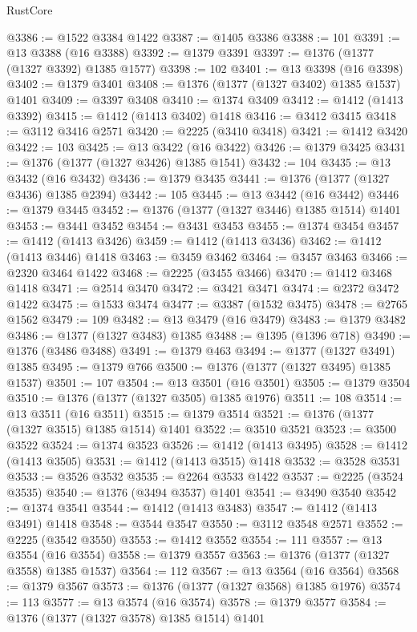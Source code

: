 \begin{lexlean}{RustCore}
\begin{coremodule}
@3386 := @1522 @3384 @1422
@3387 := @1405 @3386
@3388 := 101
@3391 := @13 @3388 (@16 @3388)
@3392 := @1379 @3391
@3397 := @1376 (@1377 (@1327 @3392) @1385 @1577)
@3398 := 102
@3401 := @13 @3398 (@16 @3398)
@3402 := @1379 @3401
@3408 := @1376 (@1377 (@1327 @3402) @1385 @1537) @1401
@3409 := @3397 @3408
@3410 := @1374 @3409
@3412 := @1412 (@1413 @3392)
@3415 := @1412 (@1413 @3402) @1418
@3416 := @3412 @3415
@3418 := @3112 @3416 @2571
@3420 := @2225 (@3410 @3418)
@3421 := @1412 @3420
@3422 := 103
@3425 := @13 @3422 (@16 @3422)
@3426 := @1379 @3425
@3431 := @1376 (@1377 (@1327 @3426) @1385 @1541)
@3432 := 104
@3435 := @13 @3432 (@16 @3432)
@3436 := @1379 @3435
@3441 := @1376 (@1377 (@1327 @3436) @1385 @2394)
@3442 := 105
@3445 := @13 @3442 (@16 @3442)
@3446 := @1379 @3445
@3452 := @1376 (@1377 (@1327 @3446) @1385 @1514) @1401
@3453 := @3441 @3452
@3454 := @3431 @3453
@3455 := @1374 @3454
@3457 := @1412 (@1413 @3426)
@3459 := @1412 (@1413 @3436)
@3462 := @1412 (@1413 @3446) @1418
@3463 := @3459 @3462
@3464 := @3457 @3463
@3466 := @2320 @3464 @1422
@3468 := @2225 (@3455 @3466)
@3470 := @1412 @3468 @1418
@3471 := @2514 @3470
@3472 := @3421 @3471
@3474 := @2372 @3472 @1422
@3475 := @1533 @3474
@3477 := @3387 (@1532 @3475)
@3478 := @2765 @1562
@3479 := 109
@3482 := @13 @3479 (@16 @3479)
@3483 := @1379 @3482
@3486 := @1377 (@1327 @3483) @1385
@3488 := @1395 (@1396 @718)
@3490 := @1376 (@3486 @3488)
@3491 := @1379 @463
@3494 := @1377 (@1327 @3491) @1385
@3495 := @1379 @766
@3500 := @1376 (@1377 (@1327 @3495) @1385 @1537)
@3501 := 107
@3504 := @13 @3501 (@16 @3501)
@3505 := @1379 @3504
@3510 := @1376 (@1377 (@1327 @3505) @1385 @1976)
@3511 := 108
@3514 := @13 @3511 (@16 @3511)
@3515 := @1379 @3514
@3521 := @1376 (@1377 (@1327 @3515) @1385 @1514) @1401
@3522 := @3510 @3521
@3523 := @3500 @3522
@3524 := @1374 @3523
@3526 := @1412 (@1413 @3495)
@3528 := @1412 (@1413 @3505)
@3531 := @1412 (@1413 @3515) @1418
@3532 := @3528 @3531
@3533 := @3526 @3532
@3535 := @2264 @3533 @1422
@3537 := @2225 (@3524 @3535)
@3540 := @1376 (@3494 @3537) @1401
@3541 := @3490 @3540
@3542 := @1374 @3541
@3544 := @1412 (@1413 @3483)
@3547 := @1412 (@1413 @3491) @1418
@3548 := @3544 @3547
@3550 := @3112 @3548 @2571
@3552 := @2225 (@3542 @3550)
@3553 := @1412 @3552
@3554 := 111
@3557 := @13 @3554 (@16 @3554)
@3558 := @1379 @3557
@3563 := @1376 (@1377 (@1327 @3558) @1385 @1537)
@3564 := 112
@3567 := @13 @3564 (@16 @3564)
@3568 := @1379 @3567
@3573 := @1376 (@1377 (@1327 @3568) @1385 @1976)
@3574 := 113
@3577 := @13 @3574 (@16 @3574)
@3578 := @1379 @3577
@3584 := @1376 (@1377 (@1327 @3578) @1385 @1514) @1401

\end{coremodule}
\end{lexlean}
